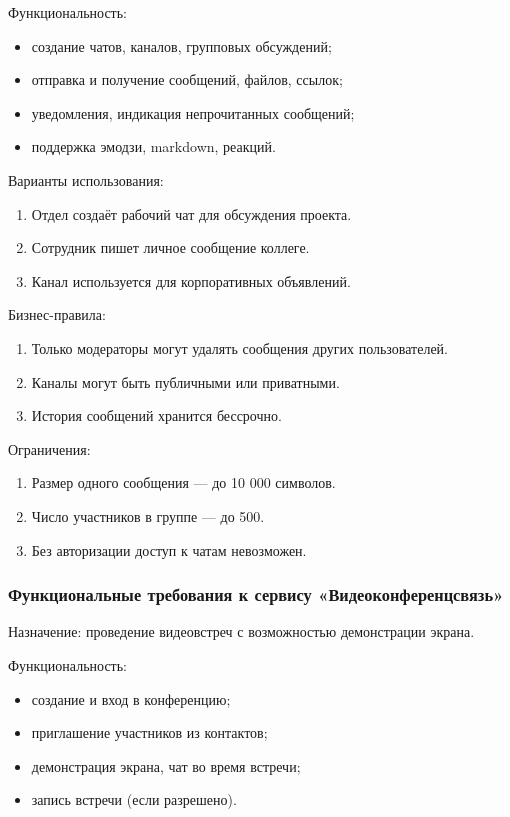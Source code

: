 Функциональность:
\begin{itemize}
  \item создание чатов, каналов, групповых обсуждений;
  \item отправка и получение сообщений, файлов, ссылок;
  \item уведомления, индикация непрочитанных сообщений;
  \item поддержка эмодзи, markdown, реакций.
\end{itemize}

Варианты использования:
\begin{enumerate}
  \item Отдел создаёт рабочий чат для обсуждения проекта.
  \item Сотрудник пишет личное сообщение коллеге.
  \item Канал используется для корпоративных объявлений.
\end{enumerate}

Бизнес-правила:
\begin{enumerate}
  \item Только модераторы могут удалять сообщения других пользователей.
  \item Каналы могут быть публичными или приватными.
  \item История сообщений хранится бессрочно.
\end{enumerate}

Ограничения:
\begin{enumerate}
  \item Размер одного сообщения — до 10 000 символов.
  \item Число участников в группе — до 500.
  \item Без авторизации доступ к чатам невозможен.
\end{enumerate}

\subsubsection{Функциональные требования к сервису «Видеоконференцсвязь»}

Назначение: проведение видеовстреч с возможностью демонстрации экрана.

Функциональность:
\begin{itemize}
  \item создание и вход в конференцию;
  \item приглашение участников из контактов;
  \item демонстрация экрана, чат во время встречи;
  \item запись встречи (если разрешено).
\end{itemize}

